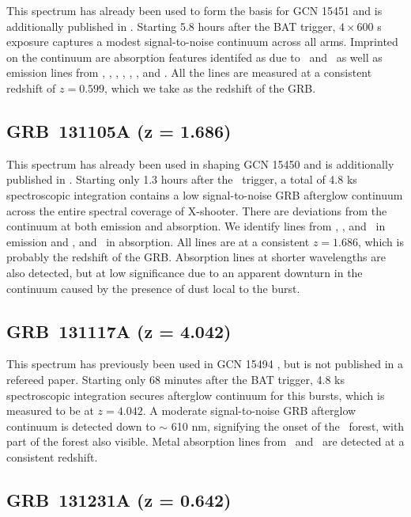 \documentclass{aa}    %
\begin{document}
This spectrum has already been used to form the basis for GCN 15451
\citep{GCN15451} and is additionally published in \citet{Kruhler2015}. Starting
5.8 hours after the BAT trigger, $4\times600$ s exposure captures a modest
signal-to-noise continuum across all arms. Imprinted on the continuum are
absorption features identifed as due to \feii~and \mgii~as well as emission
lines from \oii, \hd, \hg, \hb, \oiii, \ha, and \nii. All the lines are measured
at a consistent redshift of $z = 0.599$, which we take as the redshift of the
GRB.

\subsection{GRB~131105A (z = 1.686)}\label{131105}

This spectrum has already been used in shaping GCN 15450 \citep{GCN15450} and is
additionally published in \citet{Kruhler2015}. Starting only 1.3 hours after the
\swift~trigger, a total of 4.8 ks spectroscopic integration contains a low
signal-to-noise GRB afterglow continuum across the entire spectral coverage of
X-shooter. There are deviations from the continuum at both emission and
absorption. We identify lines from \hb, \oiii, and \ha~in emission and \feii,
and \mgii~in absorption. All lines are at a consistent $z = 1.686$, which is
probably the redshift of the GRB. Absorption lines at shorter wavelengths are
also detected, but at low significance due to an apparent downturn in the
continuum caused by the presence of dust local to the burst.

\subsection{GRB~131117A (z = 4.042)}\label{131117}

This spectrum has previously been used in GCN 15494 \citep{GCN15494}, but is not
published in a refereed paper. Starting only 68 minutes after the BAT trigger,
4.8 ks spectroscopic integration secures afterglow continuum for this bursts,
which is measured to be at $z = 4.042$. A moderate signal-to-noise GRB afterglow
continuum is detected down to $\sim$ 610 nm, signifying the onset of the
\lya~forest, with part of the forest also visible. Metal absorption lines from
\SIii~and \SIiv~are detected at a consistent redshift.

\subsection{GRB~131231A (z = 0.642)}\label{131231}
\end{document}
